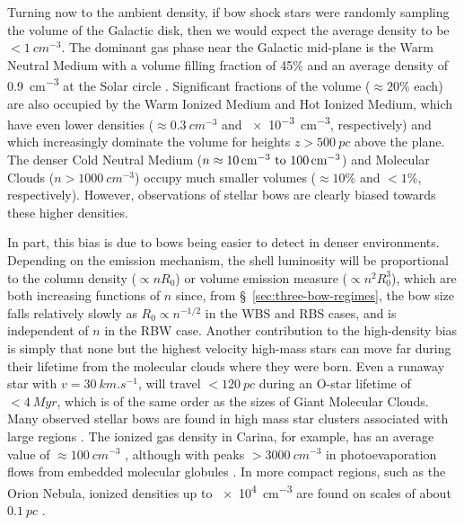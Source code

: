 Turning now to the ambient density, if bow shock stars were randomly
sampling the volume of the Galactic disk, then we would expect the
average density to be \(< \SI{1}{cm^{-3}}\).  The dominant gas phase
\citep{Ferriere:2001a} near the Galactic mid-plane is the Warm Neutral
Medium with a volume filling fraction of 45\% \citep[Fig.~11
of][]{Kalberla:2009a} and an average density of \SI{0.9}{cm^{-3}} at
the Solar circle \citep[\S~4 of][]{Kalberla:2008a}.  Significant
fractions of the volume (\(\approx 20\%\) each) are also occupied by the
Warm Ionized Medium and Hot Ionized Medium, which have even lower
densities (\(\approx \SI{0.3}{cm^{-3}}\) and \SI{e-3}{cm^{-3}},
respectively) and which increasingly dominate the volume for heights
\(z > \SI{500}{pc}\) above the plane.  The denser Cold Neutral Medium
(\(n \approx \text{\SIrange{10}{100}{cm^{-3}}}\)) and Molecular Clouds
(\(n > \SI{1000}{cm^{-3}}\)) occupy much smaller volumes
(\(\approx 10\%\) and \(< 1\%\), respectively).  However, observations of
stellar bows are clearly biased towards these higher densities.

In part, this bias is due to bows being easier to detect in denser
environments.  Depending on the emission mechanism, the shell
luminosity will be proportional to the column density
(\(\propto n R_0\)) or volume emission measure
(\(\propto n^2 R_0^3\)), which are both increasing functions of \(n\) since,
from \S~\ref{sec:three-bow-regimes}, the bow size falls relatively
slowly as \(R_0 \propto n^{-1/2}\) in the WBS and RBS cases, and is
independent of \(n\) in the RBW case.  Another contribution to the
high-density bias is simply that none but the highest velocity
high-mass stars can move far during their lifetime from the molecular
clouds where they were born.  Even a runaway star with
\(v = \SI{30}{km.s^{-1}}\), will travel \(< \SI{120}{pc}\) during an
O-star lifetime of \(< \SI{4}{Myr}\), which is of the same order as
the sizes of Giant Molecular Clouds.  Many observed stellar bows are
found in high mass star clusters associated with large \hii{} regions
\citep{Povich:2008a, Sexton:2015b}.  The ionized gas density in
Carina, for example, has an average value of
\(\approx \SI{100}{cm^{-3}}\) \citep{Oberst:2011a, Damiani:2016a}, although
with peaks \(> \SI{3000}{cm^{-3}}\) in photoevaporation flows from
embedded molecular globules \citep{Smith:2004a}.  In more compact
\hii{} regions, such as the Orion Nebula, ionized densities up to
\SI{e4}{cm^{-3}} are found on scales of about \(\SI{0.1}{pc}\)
\citep{Weilbacher:2015a, ODell:2017b}.

